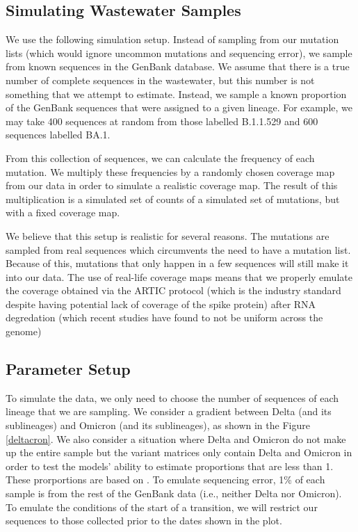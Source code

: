 \documentclass{article}
\begin{document}
\subsection{Simulating Wastewater Samples}

We use the following simulation setup.
Instead of sampling from our mutation lists (which would ignore uncommon mutations and sequencing error), we sample from known sequences in the GenBank database.
We assume that there is a true number of complete sequences in the wastewater, but this number is not something that we attempt to estimate.
Instead, we sample a known proportion of the GenBank sequences that were assigned to a given lineage.
For example, we may take 400 sequences at random from those labelled B.1.1.529 and 600 sequences labelled BA.1.

From this collection of sequences, we can calculate the frequency of each mutation.
We multiply these frequencies by a randomly chosen coverage map from our data in order to simulate a realistic coverage map.
The result of this multiplication is a simulated set of counts of a simulated set of mutations, but with a fixed coverage map.

We believe that this setup is realistic for several reasons.
The mutations are sampled from real sequences which circumvents the need to have a mutation list.
Because of this, mutations that only happen in a few sequences will still make it into our data.
The use of real-life coverage maps means that we properly emulate the coverage obtained via the ARTIC protocol (which is the industry standard despite having potential lack of coverage of the spike protein) after RNA degredation (which recent studies have found to not be uniform across the genome) 

\subsection{Parameter Setup}

To simulate the data, we only need to choose the number of sequences of each lineage that we are sampling.
We consider a gradient between Delta (and its sublineages) and Omicron (and its sublineages), as shown in the Figure \ref{deltacron}.
We also consider a situation where Delta and Omicron do not make up the entire sample but the variant matrices only contain Delta and Omicron in order to test the models' ability to estimate proportions that are less than 1.
These prorportions are based on \cite{David's invasion paper}.
To emulate sequencing error, 1\% of each sample is from the rest of the GenBank data (i.e., neither Delta nor Omicron).
To emulate the conditions of the start of a transition, we will restrict our sequences to those collected prior to the dates shown in the plot.
\end{document}

